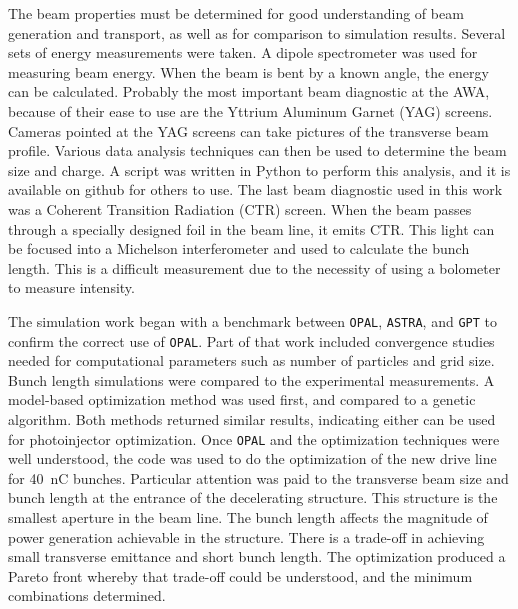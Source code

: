 The beam properties must be determined for good understanding of beam generation and transport, 
as well as for comparison to simulation results. Several sets of energy measurements were taken. 
A dipole spectrometer was used for measuring beam energy. 
When the beam is bent by a known angle, the energy can be calculated. 
Probably the most important beam diagnostic at the AWA, 
because of their ease to use are the Yttrium Aluminum Garnet (YAG) screens. 
Cameras pointed at the YAG screens can take pictures of the 
transverse beam profile. 
Various data analysis techniques can then be used to determine 
the beam size and charge. A script was written in Python
to perform this analysis, and it is available on github for others to use. 
The last beam diagnostic used in this work was a Coherent Transition Radiation (CTR) screen. When the beam passes
through a specially designed foil in the beam line, 
it emits CTR. This light can be focused into a Michelson 
interferometer and used to calculate the bunch length. 
This is a difficult measurement due to the necessity of using a 
bolometer to measure intensity. 

The simulation work began with a benchmark between \verb|OPAL|, \verb|ASTRA|, and \verb|GPT| 
to confirm the correct use of \verb|OPAL|. 
Part of that work included convergence studies needed for computational parameters such as number of particles and grid size.
Bunch length simulations were compared to the experimental measurements. 
A model-based optimization method was used first, 
and compared to a genetic algorithm. 
Both methods returned similar results, indicating either
can be used for photoinjector optimization.  
Once \verb|OPAL| and the optimization techniques were well understood, 
the code was used to do the optimization of the new drive line for \SI{40}{nC} bunches.  
Particular attention was paid to the transverse beam size and bunch length at the entrance of the decelerating structure.  
This structure is the smallest aperture in the beam line. 
The bunch length affects the magnitude of power generation achievable in the structure.  
There is a trade-off in achieving small transverse emittance and short bunch length.  
The optimization produced a Pareto front whereby that trade-off could be understood, and the minimum combinations determined.

